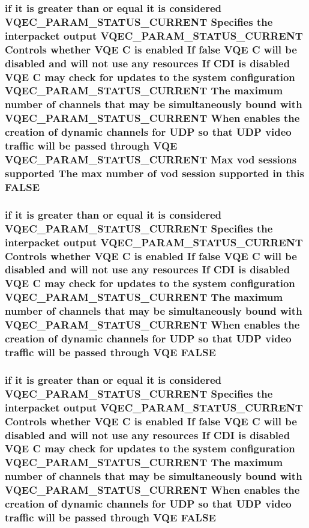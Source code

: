 \subsubsection{\setlength{\rightskip}{0pt plus 5cm}if it is greater than or equal it is considered VQEC\_\-PARAM\_\-STATUS\_\-CURRENT Specifies the interpacket output VQEC\_\-PARAM\_\-STATUS\_\-CURRENT Controls whether VQE \bf{C} is enabled If false VQE \bf{C} will be disabled and will not use any resources If CDI is disabled VQE \bf{C} may check for updates \bf{to} the system configuration VQEC\_\-PARAM\_\-STATUS\_\-CURRENT The maximum number of \bf{channels} that may be simultaneously bound with VQEC\_\-PARAM\_\-STATUS\_\-CURRENT When enables the creation of dynamic \bf{channels} for UDP so that UDP video traffic will be passed through VQE VQEC\_\-PARAM\_\-STATUS\_\-CURRENT Max vod sessions supported The max number of vod session supported in \bf{this} \bf{FALSE}}\label{vqec__cfg__settings_8h_fcec48ae23b6a0e5121492222bd963f3}


\subsubsection{\setlength{\rightskip}{0pt plus 5cm}if it is greater than or equal it is considered VQEC\_\-PARAM\_\-STATUS\_\-CURRENT Specifies the interpacket output VQEC\_\-PARAM\_\-STATUS\_\-CURRENT Controls whether VQE \bf{C} is enabled If false VQE \bf{C} will be disabled and will not use any resources If CDI is disabled VQE \bf{C} may check for updates \bf{to} the system configuration VQEC\_\-PARAM\_\-STATUS\_\-CURRENT The maximum number of \bf{channels} that may be simultaneously bound with VQEC\_\-PARAM\_\-STATUS\_\-CURRENT When enables the creation of dynamic \bf{channels} for UDP so that UDP video traffic will be passed through VQE \bf{FALSE}}\label{vqec__cfg__settings_8h_acb743cdbda86dafafdb311f52ae1b1f}


\subsubsection{\setlength{\rightskip}{0pt plus 5cm}if it is greater than or equal it is considered VQEC\_\-PARAM\_\-STATUS\_\-CURRENT Specifies the interpacket output VQEC\_\-PARAM\_\-STATUS\_\-CURRENT Controls whether VQE \bf{C} is enabled If false VQE \bf{C} will be disabled and will not use any resources If CDI is disabled VQE \bf{C} may check for updates \bf{to} the system configuration VQEC\_\-PARAM\_\-STATUS\_\-CURRENT The maximum number of \bf{channels} that may be simultaneously bound with VQEC\_\-PARAM\_\-STATUS\_\-CURRENT When enables the creation of dynamic \bf{channels} for UDP so that UDP video traffic will be passed through VQE \bf{FALSE}}\label{vqec__cfg__settings_8h_acb743cdbda86dafafdb311f52ae1b1f}


